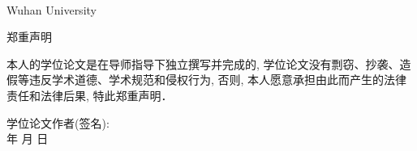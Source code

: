 \begin{center}
\the\Schoolname\\
{\sc Wuhan University}

\vspace*{1.0cm}

\the\Edate

\end{center}
  \iflib
  \else
  \newpage
  \thispagestyle{empty}
  \cleardoublepage
  \fi
{\pagestyle{empty}
\newpage
\vspace*{20pt}
\begin{center}{\heiti 郑重声明}\end{center}
\par\vspace*{30pt}
\renewcommand{\baselinestretch}{2}
{ \songti %

本人的学位论文是在导师指导下独立撰写并完成的,
学位论文没有剽窃、抄袭、造假等违反学术道德、学术规范和侵权行为,
否则, 本人愿意承担由此而产生的法律责任和法律后果,
特此郑重声明．

\vskip2cm

\hspace*{4cm}学位论文作者(签名): \hspace{4cm} \hfill \\[1cm]
\hspace*{10cm}年 \hfill  月 \hfill 日\hspace{1cm}\hfill\par}

  \iflib
  \else
  \newpage
  \cleardoublepage
  \fi
}
\renewcommand{\baselinestretch}{1.6}
\small\normalsize 




